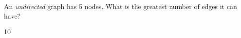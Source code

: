 \begin{prob}
    An \textit{undirected} graph has 5 nodes. What is the greatest number of
    edges it can have?

    \begin{soln}
        10
    \end{soln}

\end{prob}
